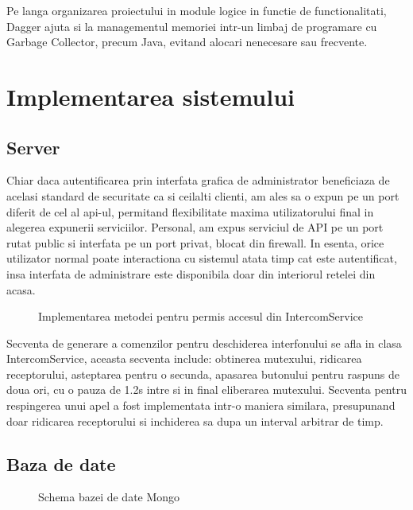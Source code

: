 Pe langa organizarea proiectului in module logice in functie de functionalitati, Dagger ajuta si la managementul memoriei intr-un limbaj de programare cu Garbage Collector, precum Java, evitand alocari nenecesare sau frecvente.


\section {Implementarea sistemului}

\subsection {Server}

Chiar daca autentificarea prin interfata grafica de administrator beneficiaza de acelasi standard de securitate ca si ceilalti clienti, am ales sa o expun pe un port diferit de cel al \acrshort{api}-ul, permitand flexibilitate maxima utilizatorului final in alegerea expunerii serviciilor. Personal, am expus serviciul de API pe un port rutat public si interfata pe un port privat, blocat din firewall. In esenta, orice utilizator normal poate interactiona cu sistemul atata timp cat este autentificat, insa interfata de administrare este disponibila doar din interiorul retelei din acasa.

\begin{figure}[h!]
  \centering
  \caption{Implementarea metodei pentru permis accesul din IntercomService}
\end{figure}

Secventa de generare a comenzilor pentru deschiderea interfonului se afla in clasa IntercomService, aceasta secventa include: obtinerea mutexului, ridicarea receptorului, asteptarea pentru o secunda, apasarea butonului pentru raspuns de doua ori, cu o pauza de 1.2s intre si in final eliberarea mutexului. Secventa pentru respingerea unui apel a fost implementata intr-o maniera similara, presupunand doar ridicarea receptorului si inchiderea sa dupa un interval arbitrar de timp.

\subsection {Baza de date}

\begin{figure}[h!]
  \centering
  \caption{Schema bazei de date Mongo}
\end{figure}

